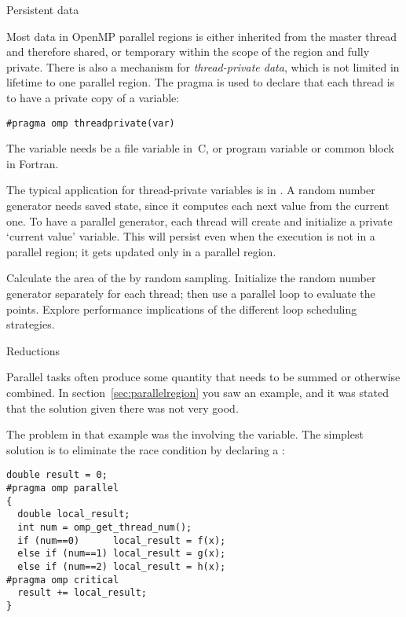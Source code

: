  {Persistent data}

Most data in OpenMP parallel regions is either inherited
from the master thread and therefore shared, or temporary within the scope of the
region and fully private.
There is also a mechanism for \emph{thread-private
  data},
which is not limited in lifetime to one parallel region.
The  pragma is used to declare that each thread
is to have a private copy of a variable:
\begin{verbatim}
#pragma omp threadprivate(var)
\end{verbatim}
The variable needs be a file variable in~C, or program variable or
common block in Fortran.

The typical application for thread-private variables is in
.
A random number generator needs saved state, since it computes each next value
from the current one. To have a parallel generator, each thread will create
and initialize a private `current value' variable. This will persist
even when the execution is not in a parallel region; it gets updated only
in a parallel region.

\begin{exercise}
  \label{ex:random-mandel}
  Calculate the area of the  by random
  sampling. Initialize the random number generator separately for each
  thread; then use a parallel loop to evaluate the points.
  Explore performance implications of the different loop scheduling strategies.
\end{exercise}

 {Reductions}

Parallel tasks often produce some quantity that needs to be summed
or otherwise combined.
In section~\ref{sec:parallelregion} you saw an example, and it was stated that the
solution given there was not very good.

The problem in that example was the  involving the 
variable. The simplest solution is to eliminate the race condition
by declaring a :
\begin{verbatim}
double result = 0;
#pragma omp parallel
{
  double local_result;
  int num = omp_get_thread_num();
  if (num==0)      local_result = f(x);
  else if (num==1) local_result = g(x);
  else if (num==2) local_result = h(x);
#pragma omp critical
  result += local_result;
}
\end{verbatim}

